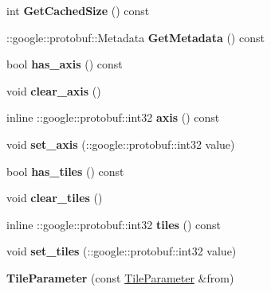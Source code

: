 \begin{DoxyCompactItemize}
int {\bfseries Get\+Cached\+Size} () const
\item 
\mbox{\label{classcaffe_1_1_tile_parameter_a76a1b87d3a700a7a2f453aeaa0c10e2e}} 
\+::google\+::protobuf\+::\+Metadata {\bfseries Get\+Metadata} () const
\item 
\mbox{\label{classcaffe_1_1_tile_parameter_a1d726599f15651c709a550c93ad8d3a9}} 
bool {\bfseries has\+\_\+axis} () const
\item 
\mbox{\label{classcaffe_1_1_tile_parameter_a3e51db76a8556d58dcd122dfd6143458}} 
void {\bfseries clear\+\_\+axis} ()
\item 
\mbox{\label{classcaffe_1_1_tile_parameter_ac0986bf3d2a627d61d50e11fd07558f9}} 
inline \+::google\+::protobuf\+::int32 {\bfseries axis} () const
\item 
\mbox{\label{classcaffe_1_1_tile_parameter_ad3d943987ee12c9183bdff659a65c310}} 
void {\bfseries set\+\_\+axis} (\+::google\+::protobuf\+::int32 value)
\item 
\mbox{\label{classcaffe_1_1_tile_parameter_a2b41dd4b3953720513b8d36a9c6e9f08}} 
bool {\bfseries has\+\_\+tiles} () const
\item 
\mbox{\label{classcaffe_1_1_tile_parameter_abb77a7c16b945b078a8ffe96359bb2fa}} 
void {\bfseries clear\+\_\+tiles} ()
\item 
\mbox{\label{classcaffe_1_1_tile_parameter_a86371881a3fa29c45ff632a4ec798543}} 
inline \+::google\+::protobuf\+::int32 {\bfseries tiles} () const
\item 
\mbox{\label{classcaffe_1_1_tile_parameter_a85350c69d8b189a39ad63439c8f06955}} 
void {\bfseries set\+\_\+tiles} (\+::google\+::protobuf\+::int32 value)
\item 
\mbox{\label{classcaffe_1_1_tile_parameter_a1f66425c93d43285640047e9f03af2fb}} 
{\bfseries Tile\+Parameter} (const \mbox{\hyperlink{classcaffe_1_1_tile_parameter}{Tile\+Parameter}} \&from)

\end{DoxyCompactItemize}
